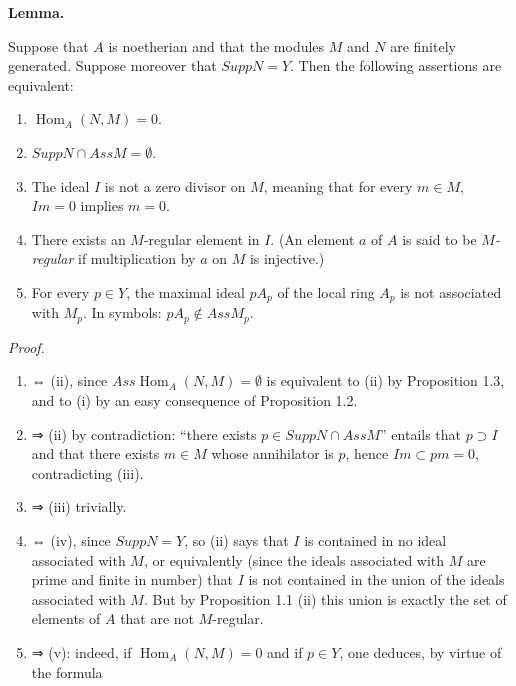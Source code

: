 \documentclass[
  11pt,
  a4paper,
]{book}
\providecommand{\tightlist}{%
  \setlength{\itemsep}{0pt}\setlength{\parskip}{0pt}}
\begin{document}
\textbf{Lemma.}

Suppose that \(A\) is noetherian and that the modules \(M\) and \(N\)
are finitely generated. Suppose moreover that \(Supp N =
Y\). Then the following assertions are equivalent:

\begin{enumerate}
\def\labelenumi{\arabic{enumi}.}
\tightlist
\item
  \(\operatorname{Hom}_{A}(N, M) = 0\).
\item
  \(Supp N \cap Ass M = \emptyset\).
\item
  The ideal \(I\) is not a zero divisor on \(M\), meaning that for every
  \(m \in M\), \(Im = 0\) implies \(m = 0\).
\item
  There exists an \(M\)-regular element in \(I\). (An element \(a\) of
  \(A\) is said to be \emph{\(M\)-regular} if multiplication by \(a\) on
  \(M\) is injective.)
\item
  For every \(p \in Y\), the maximal ideal \(pA_{p}\) of the local ring
  \(A_{p}\) is not associated with \(M_{p}\). In symbols:
  \(pA_{p} \notin Ass M_{p}\).
\end{enumerate}

\emph{Proof.}

\begin{enumerate}
\def\labelenumi{(\roman{enumi})}
\item
  ⇔ (ii), since \(Ass \operatorname{Hom}_{A}(N, M) = \emptyset\) is
  equivalent to (ii) by Proposition 1.3, and to (i) by an easy
  consequence of Proposition 1.2.
\item
  ⇒ (ii) by contradiction: ``there exists \(p \in Supp N \cap Ass M\)''
  entails that \(p \supset I\) and that there exists \(m \in M\) whose
  annihilator is \(p\), hence \(Im \subset pm = 0\), contradicting
  (iii).
\item
  ⇒ (iii) trivially.
\item
  ⇔ (iv), since \(Supp N = Y\), so (ii) says that \(I\) is contained in
  no ideal associated with \(M\), or equivalently (since the ideals
  associated with \(M\) are prime and finite in number) that \(I\) is
  not contained in the union of the ideals associated with \(M\). But by
  Proposition 1.1 (ii) this union is exactly the set of elements of
  \(A\) that are not \(M\)-regular.
\item
  ⇒ (v): indeed, if \(\operatorname{Hom}_{A}(N, M) = 0\) and if
  \(p \in Y\), one deduces, by virtue of the formula
\end{enumerate}
\end{document}
